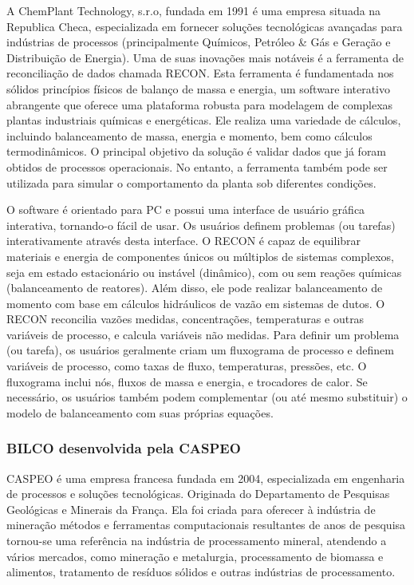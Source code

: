 A ChemPlant Technology, s.r.o, fundada em 1991 é uma empresa situada na Republica Checa, especializada em fornecer soluções tecnológicas avançadas para indústrias de processos (principalmente Químicos, Petróleo & Gás e Geração e Distribuição de Energia). Uma de suas inovações mais notáveis é a ferramenta de reconciliação de dados chamada RECON. Esta ferramenta é fundamentada nos sólidos princípios físicos de balanço de massa e energia, um software interativo abrangente que oferece uma plataforma robusta para modelagem de complexas plantas industriais químicas e energéticas. Ele realiza uma variedade de cálculos, incluindo balanceamento de massa, energia e momento, bem como cálculos termodinâmicos. O principal objetivo da solução é validar dados que já foram obtidos de processos operacionais. No entanto, a ferramenta também pode ser utilizada para simular o comportamento da planta sob diferentes condições.

O software é orientado para PC e possui uma interface de usuário gráfica interativa, tornando-o fácil de usar. Os usuários definem problemas (ou tarefas) interativamente através desta interface. O RECON é capaz de equilibrar materiais e energia de componentes únicos ou múltiplos de sistemas complexos, seja em estado estacionário ou instável (dinâmico), com ou sem reações químicas (balanceamento de reatores). Além disso, ele pode realizar balanceamento de momento com base em cálculos hidráulicos de vazão em sistemas de dutos. O RECON reconcilia vazões medidas, concentrações, temperaturas e outras variáveis de processo, e calcula variáveis não medidas. Para definir um problema (ou tarefa), os usuários geralmente criam um fluxograma de processo e definem variáveis de processo, como taxas de fluxo, temperaturas, pressões, etc. O fluxograma inclui nós, fluxos de massa e energia, e trocadores de calor. Se necessário, os usuários também podem complementar (ou até mesmo substituir) o modelo de balanceamento com suas próprias equações.

\subsubsection{BILCO desenvolvida pela CASPEO}

CASPEO é uma empresa francesa fundada em 2004, especializada em engenharia de processos e soluções tecnológicas. Originada do 
Departamento de Pesquisas Geológicas e Minerais da França. Ela foi criada para oferecer à indústria de mineração métodos e ferramentas computacionais resultantes de anos de pesquisa tornou-se uma referência na indústria de processamento mineral, atendendo a vários mercados, como mineração e metalurgia, processamento de biomassa e alimentos, tratamento de resíduos sólidos e outras indústrias de processamento. 

